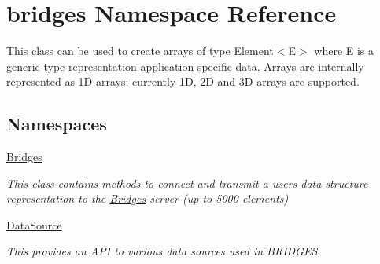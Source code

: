 \hypertarget{namespacebridges}{}\section{bridges Namespace Reference}
\label{namespacebridges}


This class can be used to create arrays of type Element$<$\+E$>$ where E is a generic type representation application specific data. Arrays are internally represented as 1\+D arrays; currently 1\+D, 2\+D and 3\+D arrays are supported.  


\subsection*{Namespaces}
\begin{DoxyCompactItemize}
\item 
 \hyperlink{namespacebridges_1_1_bridges}{Bridges}
\begin{DoxyCompactList}\small\item\em This class contains methods to connect and transmit a user\textquotesingle{}s data structure representation to the \hyperlink{namespacebridges_1_1_bridges}{Bridges} server (up to 5000 elements) \end{DoxyCompactList}\item 
 \hyperlink{namespacebridges_1_1_data_source}{Data\+Source}
\begin{DoxyCompactList}\small\item\em This provides an A\+P\+I to various data sources used in B\+R\+I\+D\+G\+E\+S. \end{DoxyCompactList}\end{DoxyCompactItemize}
